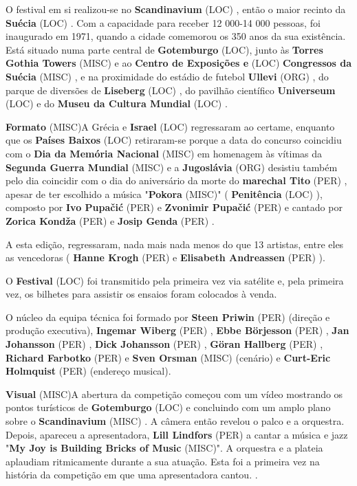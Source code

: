 \documentclass[12pt,a4paper]{article}
\begin{document}
O festival em si realizou-se no \textbf{Scandinavium} (LOC) , então o maior recinto da \textbf{Suécia} (LOC) . Com a capacidade para receber 12 000-14 000 pessoas, foi inaugurado em 1971, quando a cidade comemorou os 350 anos da sua existência. Está situado numa parte central de \textbf{Gotemburgo} (LOC), junto às \textbf{Torres Gothia Towers} (MISC) e ao \textbf{Centro de Exposições e} (LOC) \textbf{Congressos da Suécia} (MISC) , e na proximidade do estádio de futebol \textbf{Ullevi} (ORG) , do parque de diversões de \textbf{Liseberg} (LOC) , do pavilhão científico \textbf{Universeum} (LOC) e do \textbf{Museu da Cultura Mundial} (LOC) .



\textbf{Formato} (MISC)A Grécia e \textbf{Israel} (LOC) regressaram ao certame, enquanto que os \textbf{Países Baixos} (LOC) retiraram-se porque a data do concurso coincidiu com o \textbf{Dia da Memória Nacional} (MISC) em homenagem às vítimas da \textbf{Segunda Guerra Mundial} (MISC) e a \textbf{Jugoslávia} (ORG) desistiu também pelo dia coincidir com o dia do aniversário da morte do \textbf{marechal Tito} (PER) , apesar de ter escolhido a música "\textbf{Pokora} (MISC)" ( \textbf{Penitência} (LOC) ), composto por \textbf{Ivo Pupačić} (PER) e \textbf{Zvonimir Pupačić} (PER) e cantado por \textbf{Zorica Kondža} (PER) e \textbf{Josip Genda} (PER) .

A esta edição, regressaram, nada mais nada menos do que 13 artistas, entre eles as vencedoras ( \textbf{Hanne Krogh} (PER) e \textbf{Elisabeth Andreassen} (PER) ).

O \textbf{Festival} (LOC) foi transmitido pela primeira vez via satélite e, pela primeira vez, os bilhetes para assistir os ensaios foram colocados à venda.

O núcleo da equipa técnica foi formado por \textbf{Steen Priwin} (PER) (direção e produção executiva), \textbf{Ingemar Wiberg} (PER) , \textbf{Ebbe Börjesson} (PER) , \textbf{Jan Johansson} (PER) , \textbf{Dick Johansson} (PER) , \textbf{Göran Hallberg} (PER) , \textbf{Richard Farbotko} (PER) e \textbf{Sven Orsman} (MISC) (cenário) e \textbf{Curt-Eric Holmquist} (PER) (endereço musical).



\textbf{Visual} (MISC)A abertura da competição começou com um vídeo mostrando os pontos turísticos de \textbf{Gotemburgo} (LOC) e concluindo com um amplo plano sobre o \textbf{Scandinavium} (MISC) . A câmera então revelou o palco e a orquestra. Depois, apareceu a apresentadora, \textbf{Lill Lindfors} (PER) a cantar a música e jazz "\textbf{My Joy is Building Bricks of Music} (MISC)". A orquestra e a plateia aplaudiam ritmicamente durante a sua atuação. Esta foi a primeira vez na história da competição em que uma apresentadora cantou. .
\end{document}
